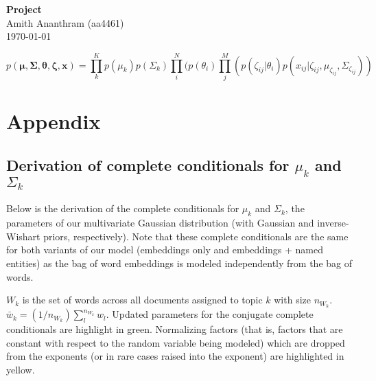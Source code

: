 \documentclass[12pt]{article}
\begin{document}
\begin{flushleft}
\textbf{Project} \\
Amith Ananthram (aa4461) \\
\today
\end{flushleft}

\vspace{0.1in}

\normalsize

\begin{equation*}
p(\bm{\mu}, \bm{\Sigma}, \bm{\theta}, \bm{\zeta}, \bm{x}) = \prod^{K}_{k} p(\mu_k)p(\Sigma_k)\prod^N_{i}(p(\theta_i)\prod^M_{j}(p(\zeta_{ij} | \theta_i)p(x_{ij} | \zeta_{ij}, \mu_{\zeta_{ij}}, \Sigma_{\zeta_{ij}}))
\end{equation*}

\pagebreak

\section{Appendix}

\subsection{Derivation of complete conditionals for $\mu_k$ and $\Sigma_k$}

Below is the derivation of the complete conditionals for $\mu_k$ and $\Sigma_k$, the parameters of our multivariate Gaussian distribution (with Gaussian and inverse-Wishart priors, respectively).  Note that these complete conditionals are the same for both variants of our model (embeddings only and embeddings + named entities) as the bag of word embeddings is modeled independently from the bag of words.

$W_k$ is the set of words across all documents assigned to topic $k$ with size $n_{W_k}$.  $\bar{w}_k = (1/n_{W_k})\sum^{n_{W_k}}_l w_l$.  Updated parameters for the conjugate complete conditionals are highlight in green.  Normalizing factors (that is, factors that are constant with respect to the random variable being modeled) which are dropped from the exponents (or in rare cases raised into the exponent) are highlighted in yellow.
\end{document}
